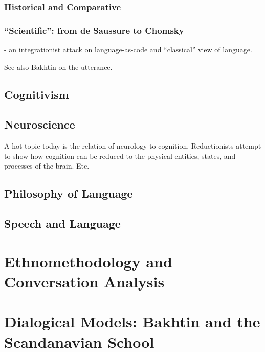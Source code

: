 \documentclass[11pt,twoside]{article}
\begin{document}
\subsubsection{Historical and Comparative}

\subsubsection{``Scientific'': from de Saussure to Chomsky}

\cite{love_cognition_2004} - an integrationist attack on
language-as-code and ``classical'' view of language.

See also Bakhtin on the utterance.

\subsection{Cognitivism}

\cite{levinson_cognition_2006}

\subsection{Neuroscience}

A hot topic today is the relation of neurology to cognition.
Reductionists attempt to show how cognition can be reduced to the
physical entities, states, and processes of the brain.  Etc.

\subsection{Philosophy of Language}

\subsection{Speech and Language}

\section{Ethnomethodology and Conversation Analysis}

\begin{abstract}

\end{abstract}

\section{Dialogical Models: Bakhtin and the Scandanavian School}
\end{document}
